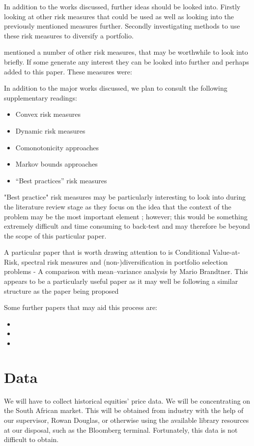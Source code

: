 \documentclass[12pt,a4paper]{article}
\newcommand{\bi}{\begin{itemize}}
\newcommand{\ei}{\end{itemize}}
\begin{document}
In addition to the works discussed, further ideas should be looked into. Firstly looking at other risk measures that could be used as well as looking into the previously mentioned measures further. Secondly investigating methods to use these risk measures to diversify a portfolio. 

\cite{dowd2006after} mentioned a number of other risk measures, that may be worthwhile to look into briefly. If some generate any interest they can be looked into further and perhaps added to this paper. These measures were:

In addition to the major works discussed, we plan to consult the following supplementary readings:
\bi
\item Convex risk measures
\item Dynamic risk measures
\item Comonotonicity approaches
\item Markov bounds approaches
\item “Best practices” risk measures
\ei
 
 "Best practice" risk measures may be particularly interesting to look into during the literature review stage as they focus on the idea that the context of the problem may be the most important element \citep{dowd2006after}; however; this would be something extremely difficult and time consuming to back-test and may therefore be beyond the scope of this particular paper.

A particular paper that is worth drawing attention to is Conditional Value-at-Risk, spectral risk measures and
(non-)diversification in portfolio selection problems - A comparison with mean–variance analysis by Mario Brandtner. This appears to be a particularly useful paper as it may well be following a similar structure as the paper being proposed

Some further papers that may aid this process are: 
\bi
\item 
\item 
\item
\ei

\section{Data}
\label{sec:data}

We will have to collect historical equities' price data. We will be concentrating on the South African market. This will be obtained from industry with the help of our supervisor, Rowan Douglas, or otherwise using the available library resources at our disposal, such as the Bloomberg terminal. Fortunately, this data is not difficult to obtain.
\end{document}
